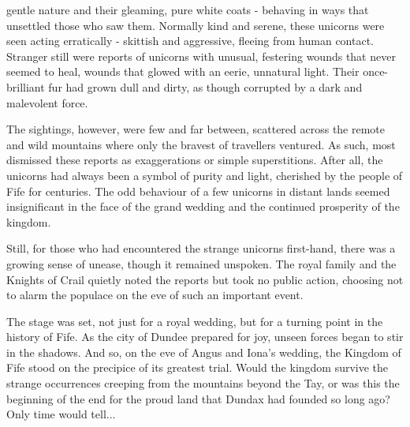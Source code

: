 \begin{multicols}{2}
{\entryfont \noindent gentle nature and their gleaming, pure white coats - behaving in ways that unsettled those who saw them. Normally kind and serene, these unicorns were seen acting erratically - skittish and aggressive, fleeing from human contact. Stranger still were reports of unicorns with unusual, festering wounds that never seemed to heal, wounds that glowed with an eerie, unnatural light. Their once-brilliant fur had grown dull and dirty, as though corrupted by a dark and malevolent force.

The sightings, however, were few and far between, scattered across the remote and wild mountains where only the bravest of travellers ventured. As such, most dismissed these reports as exaggerations or simple superstitions. After all, the unicorns had always been a symbol of purity and light, cherished by the people of Fife for centuries. The odd behaviour of a few unicorns in distant lands seemed insignificant in the face of the grand wedding and the continued prosperity of the kingdom.

Still, for those who had encountered the strange unicorns first-hand, there was a growing sense of unease, though it remained unspoken. The royal family and the Knights of Crail quietly noted the reports but took no public action, choosing not to alarm the populace on the eve of such an important event.

The stage was set, not just for a royal wedding, but for a turning point in the history of Fife. As the city of Dundee prepared for joy, unseen forces began to stir in the shadows. And so, on the eve of Angus and Iona's wedding, the Kingdom of Fife stood on the precipice of its greatest trial. Would the kingdom survive the strange occurrences creeping from the mountains beyond the Tay, or was this the beginning of the end for the proud land that Dundax had founded so long ago? Only time would tell...}
\end{multicols}
\vspace*{-4em}\hfill\\
\noindent{}%
\twocolumn